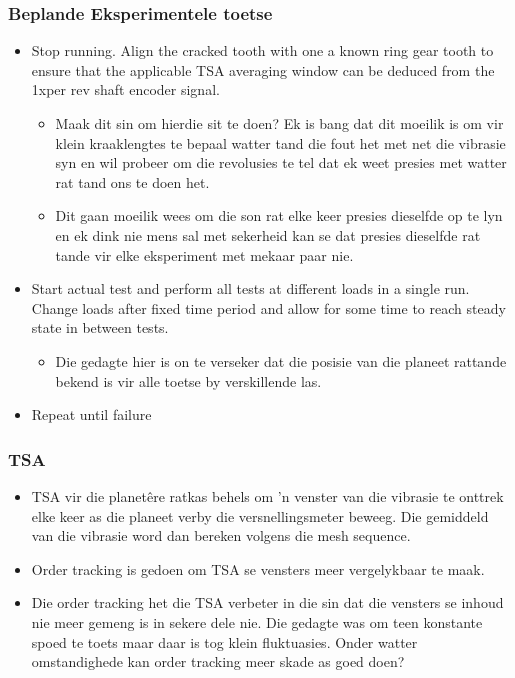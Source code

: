 \documentclass{beamer}
\begin{document}
\begin{frame}
\frametitle{Beplande Eksperimentele toetse}
\begin{itemize}
	\item Stop running. Align the cracked tooth with one a known ring gear tooth to ensure that the applicable TSA averaging window can be deduced from the 1xper rev shaft encoder signal.
	\begin{itemize}
		\item Maak dit sin om hierdie sit te doen? Ek is bang dat dit moeilik is om vir klein kraaklengtes te bepaal watter tand die fout het met net die vibrasie syn en wil probeer om die revolusies te tel dat ek weet presies met watter rat tand ons te doen het. 
		\item Dit gaan moeilik wees om die son rat elke keer presies dieselfde op te lyn en ek dink nie mens sal met sekerheid kan se dat presies dieselfde rat tande vir elke eksperiment met mekaar paar nie. 
	\end{itemize}
	
	\item Start actual test and perform all tests at different loads in a single run. Change loads after fixed time period and allow for some time to reach steady state in between tests.
		\begin{itemize}
		\item Die gedagte hier is on te verseker dat die posisie van die planeet rattande bekend is vir alle toetse by verskillende las.
	\end{itemize}
    \item Repeat until failure
\end{itemize}
\end{frame}


\begin{frame}
\frametitle{TSA}
\begin{itemize}
	\item  TSA vir die planetêre ratkas behels om 'n venster van die vibrasie te onttrek elke keer as die planeet verby die versnellingsmeter beweeg. Die gemiddeld van die vibrasie word dan bereken volgens die mesh sequence.
	\item  Order tracking is gedoen om TSA se vensters meer vergelykbaar te maak. 
	\item Die order tracking het die TSA verbeter in die sin dat die vensters se inhoud nie meer gemeng is in sekere dele nie. Die gedagte was om teen konstante spoed te toets maar daar is tog klein fluktuasies. Onder watter omstandighede kan order tracking meer skade as goed doen? 
\end{itemize}



\end{frame}
\end{document}
